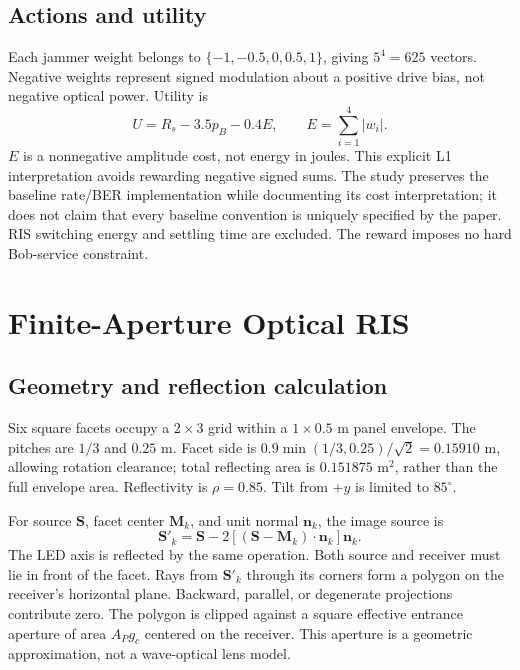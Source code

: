\documentclass[journal,10pt,twocolumn]{IEEEtran}
\begin{document}
\subsection{Actions and utility}
Each jammer weight belongs to $\{-1,-0.5,0,0.5,1\}$, giving $5^4=625$ vectors. Negative weights represent signed modulation about a positive drive bias, not negative optical power. Utility is
\begin{equation}
U=R_s-3.5p_B-0.4E,\qquad E=\sum_{i=1}^{4}|w_i|.
\label{eq:utility}
\end{equation}
$E$ is a nonnegative amplitude cost, not energy in joules. This explicit L1 interpretation avoids rewarding negative signed sums. The study preserves the baseline rate/BER implementation while documenting its cost interpretation; it does not claim that every baseline convention is uniquely specified by the paper. RIS switching energy and settling time are excluded. The reward imposes no hard Bob-service constraint.

\section{Finite-Aperture Optical RIS}
\subsection{Geometry and reflection calculation}
Six square facets occupy a $2\times3$ grid within a $1\times0.5$ m panel envelope. The pitches are $1/3$ and $0.25$ m. Facet side is $0.9\min(1/3,0.25)/\sqrt2=0.15910$ m, allowing rotation clearance; total reflecting area is $0.151875$ m$^2$, rather than the full envelope area. Reflectivity is $\rho=0.85$. Tilt from $+y$ is limited to $85^\circ$.

For source $\mathbf S$, facet center $\mathbf M_k$, and unit normal $\mathbf n_k$, the image source is
\begin{equation}
\mathbf S'_k=\mathbf S-2[(\mathbf S-\mathbf M_k)\cdot\mathbf n_k]\mathbf n_k.
\end{equation}
The LED axis is reflected by the same operation. Both source and receiver must lie in front of the facet. Rays from $\mathbf S'_k$ through its corners form a polygon on the receiver's horizontal plane. Backward, parallel, or degenerate projections contribute zero. The polygon is clipped against a square effective entrance aperture of area $A_Pg_c$ centered on the receiver. This aperture is a geometric approximation, not a wave-optical lens model.
\end{document}

